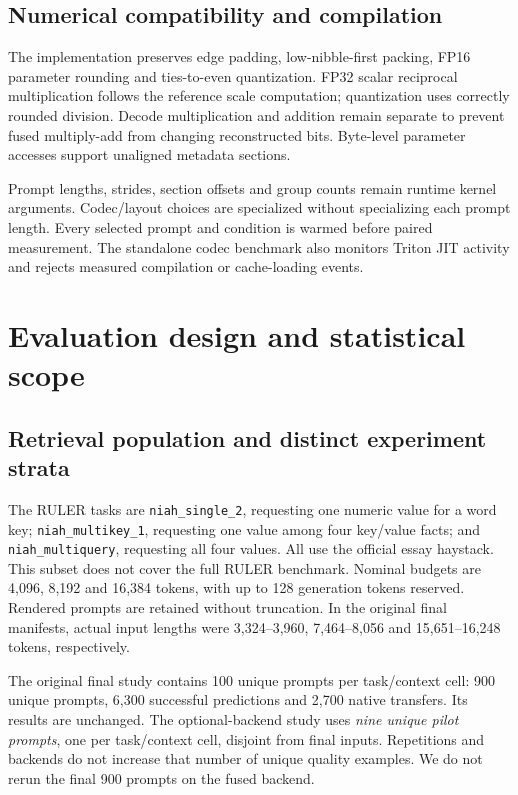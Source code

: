 \documentclass[10pt,twocolumn,letterpaper]{article}
\begin{document}
\subsection{Numerical compatibility and compilation}
The implementation preserves edge padding, low-nibble-first packing, FP16
parameter rounding and ties-to-even quantization. FP32 scalar reciprocal
multiplication follows the reference scale computation; quantization uses
correctly rounded division. Decode multiplication and addition remain separate
to prevent fused multiply-add from changing reconstructed bits. Byte-level
parameter accesses support unaligned metadata sections.

Prompt lengths, strides, section offsets and group counts remain runtime kernel
arguments. Codec/layout choices are specialized without specializing each
prompt length. Every selected prompt and condition is warmed before paired
measurement. The standalone codec benchmark also monitors Triton JIT activity
and rejects measured compilation or cache-loading events.

\section{Evaluation design and statistical scope}
\subsection{Retrieval population and distinct experiment strata}
The RULER tasks are \texttt{niah\_single\_2}, requesting one numeric value for a
word key; \texttt{niah\_multikey\_1}, requesting one value among four key/value
facts; and \texttt{niah\_multiquery}, requesting all four values. All use the
official essay haystack. This subset does not cover the full RULER benchmark.
Nominal budgets are 4,096, 8,192 and 16,384 tokens, with up to 128 generation
tokens reserved. Rendered prompts are retained without truncation. In the
original final manifests, actual input lengths were 3,324--3,960,
7,464--8,056 and 15,651--16,248 tokens, respectively.

The original final study contains 100 unique prompts per task/context cell:
900 unique prompts, 6,300 successful predictions and 2,700 native transfers.
Its results are unchanged. The optional-backend study uses \emph{nine unique
pilot prompts}, one per task/context cell, disjoint from final inputs.
Repetitions and backends do not increase that number of unique quality
examples. We do not rerun the final 900 prompts on the fused backend.
\end{document}
